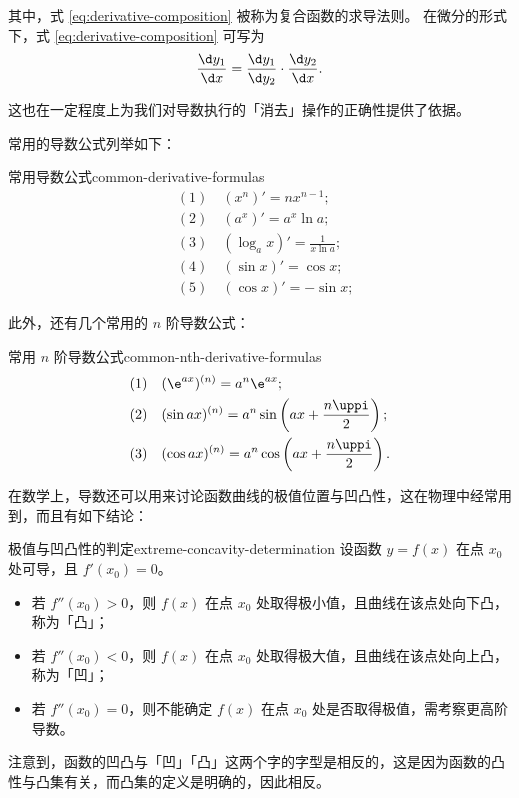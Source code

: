 其中，式 \cref{eq:derivative-composition} 被称为复合函数的求导法则。
在微分的形式下，式 \cref{eq:derivative-composition} 可写为
\begin{equation}
    \frac{\d y_1}{\d x} = \frac{\d y_1}{\d y_2} \cdot \frac{\d y_2}{\d x} .
\end{equation}

这也在一定程度上为我们对导数执行的「消去」操作的正确性提供了依据。
\bigskip

常用的导数公式列举如下：
\begin{physlist}{常用导数公式}{common-derivative-formulas}
    \begin{align}
         & (1)\quad (x^n)' = n x^{n-1} ;               \\
         & (2)\quad (a^x)' = a^x \ln a ;               \\
         & (3)\quad (\log _a x)' = \frac{1}{x \ln a} ; \\
         & (4)\quad (\sin x)' = \cos x ;               \\
         & (5)\quad (\cos x)' = -\sin x ;
    \end{align}

\end{physlist}

此外，还有几个常用的 $ n $ 阶导数公式：
\begin{physlist}{常用 $ n $ 阶导数公式}{common-nth-derivative-formulas}
    \begin{align}
         & (1)\quad (\e^{a x})^{(n)} = a^n \e^{a x} ;                                    \\
         & (2)\quad (\sin a x)^{(n)} = a^n \sin \left( a x + \frac{n \uppi}{2} \right) ; \\
         & (3)\quad (\cos a x)^{(n)} = a^n \cos \left( a x + \frac{n \uppi}{2} \right) .
    \end{align}

\end{physlist}

在数学上，导数还可以用来讨论函数曲线的极值位置与凹凸性，这在物理中经常用到，而且有如下结论：
\begin{definition}{极值与凹凸性的判定}{extreme-concavity-determination}
    设函数 $ y = f(x) $ 在点 $ x_0 $ 处可导，且 $ f'(x_0) = 0 $。
    \begin{itemize}
        \item 若 $ f''(x_0) > 0 $，则 $ f(x) $ 在点 $ x_0 $ 处取得极小值，且曲线在该点处向下凸，称为「凸」；
        \item 若 $ f''(x_0) < 0 $，则 $ f(x) $ 在点 $ x_0 $ 处取得极大值，且曲线在该点处向上凸，称为「凹」；
        \item 若 $ f''(x_0) = 0 $，则不能确定 $ f(x) $ 在点 $ x_0 $ 处是否取得极值，需考察更高阶导数。
    \end{itemize}

    注意到，函数的凹凸与「凹」「凸」这两个字的字型是相反的，这是因为函数的凸性与凸集有关，而凸集的定义是明确的，因此相反。

\end{definition}

